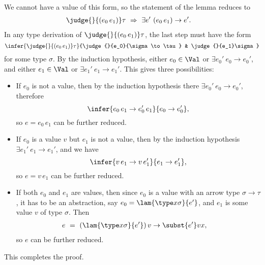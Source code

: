 We cannot have a value of this form, so the statement of the lemma reduces to
\begin{align*}
\judge{}{(e_0\,e_1)}\tau\ &\Rightarrow\ \exists e'\ (e_0\,e_1)\to e'.
\end{align*}
In any type derivation of $\judge{}{(e_0\,e_1)}\tau$, the last step must have the form
\[
\infer{\judge{}{(e_0\,e_1)}\tau}{\judge{}{e_0}{\sigma\to\tau} & \judge{}{e_1}\sigma}
\]
for some type $\sigma$. By the induction hypothesis, either $e_0\in\Val$ or $\exists e_0'\ e_0\to e_0'$, and either $e_1\in\Val$ or $\exists e_1'\ e_1\to e_1'$. This gives three possibilities:
\begin{itemize}
\item If $e_0$ is not a value, then by the induction hypothesis there $\exists e_0'\ e_0\to e_0'$, therefore
\[
\infer{e_0\,e_1\to e_0'\,e_1}{e_0\to e_0'},
\]
so $e=e_0\,e_1$ can be further reduced.

\item If $e_0$ is a value $v$ but $e_1$ is not a value, then by the induction hypothesis $\exists e_1'\ e_1\to e_1'$, and we have
\[
\infer{v\,e_1\to v\,e_1'}{e_1\to e_1'},
\]
so $e=v\,e_1$ can be further reduced.
\item
If both $e_0$ and $e_1$ are values, then since $e_0$ is a value with an arrow type $\sigma\to\tau$, it has to be an abstraction, say $e_0=\lam{\type x\sigma}{e'}$, and $e_1$ is some value $v$ of type $\sigma$. Then
\begin{align*}
e\ &=\ (\lam{\type x\sigma}{e'})\,v \to \subst{e'}vx,
\end{align*}
so $e$ can be further reduced.
\end{itemize}
This completes the proof.
